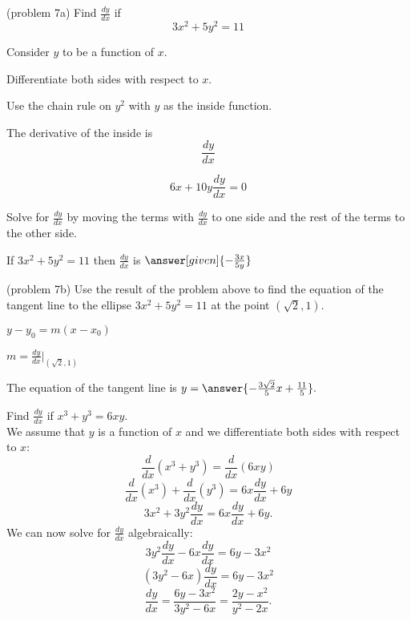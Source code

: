 \documentclass{ximera}
\begin{document}
\begin{center}
\begin{foldable}
\end{foldable}
\end{center}


\begin{problem}(problem 7a)
  Find $\frac{dy}{dx}$ if
  \[
  3x^2 + 5y^2 = 11
  \]
  
	  
    \begin{hint}
      Consider $y$ to be a function of $x$.
    \end{hint}
		\begin{hint}
		  Differentiate both sides with respect to $x$.
		\end{hint}
    \begin{hint}
      Use the chain rule on $y^2$ with $y$ as the inside function.
    \end{hint}
    \begin{hint}
      The derivative of the inside is 
      \[
      \frac{dy}{dx}
      \]
    \end{hint}
		\begin{hint}
		  \[
			6x + 10y\frac{dy}{dx} = 0
			\]
		\end{hint}
		\begin{hint}
		  Solve for $\frac{dy}{dx}$ by moving the terms with $\frac{dy}{dx}$ to one side and the 
			rest of the terms to the other side.
		\end{hint}
    
		If $3x^2 + 5y^2 = 11$ then $\frac{dy}{dx}$ is
		 $\answer[given]{-\frac{3x}{5y}}$
		
\end{problem}


\begin{problem}(problem 7b)
Use the result of the problem above to find the equation of the tangent line to the ellipse $3x^2 + 5y^2 = 11$ at the point $(\sqrt 2,1).$

\begin{hint}
$y-y_0 = m(x-x_0)$
\end{hint}
\begin{hint}
$m = \frac{dy}{dx}\bigg|_{(\sqrt 2, 1)}$
\end{hint}
The equation of the tangent line is $y = \answer{-\frac{3\sqrt 2}{5} x + \frac{11}{5}}.$
\end{problem}



\begin{example}[example 8]
Find  $\frac{dy}{dx}$ if $x^3 + y^3 =6xy$.\\
We assume that $y$ is a function of $x$ and we differentiate both 
sides with respect to $x$:
\[\frac{d}{dx}(x^3 + y^3)  = \frac{d}{dx} (6xy)\]
\[\frac{d}{dx}(x^3) + \frac{d}{dx}(y^3)  = 6x\frac{dy}{dx} + 6y\]
\[3x^2 + 3y^2\frac{dy}{dx}  = 6x\frac{dy}{dx} + 6y.\]
We can now solve for $\displaystyle{\frac{dy}{dx}}$ algebraically:
\[3y^2\frac{dy}{dx}  - 6x\frac{dy}{dx} = 6y-3x^2\]
\[(3y^2- 6x)\frac{dy}{dx}   = 6y-3x^2\]
\[\frac{dy}{dx}   = \frac{6y-3x^2}{3y^2- 6x} = \frac{2y-x^2}{y^2- 2x}.\]
\end{example}
\end{document}
